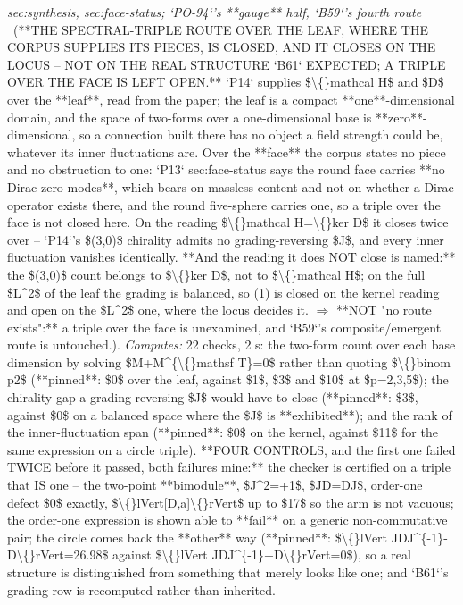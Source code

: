 \begin{description}
\textit{sec:synthesis, sec:face-status; `PO-94`'s **gauge** half, `B59`'s fourth route} \ (**THE SPECTRAL-TRIPLE ROUTE OVER THE LEAF, WHERE THE CORPUS SUPPLIES ITS PIECES, IS CLOSED, AND IT CLOSES ON THE LOCUS -- NOT ON THE REAL STRUCTURE `B61` EXPECTED; A TRIPLE OVER THE FACE IS LEFT OPEN.** `P14` supplies \$\textbackslash\{\}mathcal H\$ and \$D\$ over the **leaf**, read from the paper; the leaf is a compact **one**-dimensional domain, and the space of two-forms over a one-dimensional base is **zero**-dimensional, so a connection built there has no object a field strength could be, whatever its inner fluctuations are. Over the **face** the corpus states no piece and no obstruction to one: `P13` sec:face-status says the round face carries **no Dirac zero modes**, which bears on massless content and not on whether a Dirac operator exists there, and the round five-sphere carries one, so a triple over the face is not closed here. On the reading \$\textbackslash\{\}mathcal H=\textbackslash\{\}ker D\$ it closes twice over -- `P14`'s \$(3,0)\$ chirality admits no grading-reversing \$J\$, and every inner fluctuation vanishes identically.  **And the reading it does NOT close is named:** the \$(3,0)\$ count belongs to \$\textbackslash\{\}ker D\$, not to \$\textbackslash\{\}mathcal H\$; on the full \$L\textasciicircum{}2\$ of the leaf the grading is balanced, so (1) is closed on the kernel reading and open on the \$L\textasciicircum{}2\$ one, where the locus decides it. \ensuremath{\Rightarrow} **NOT "no route exists":** a triple over the face is unexamined, and `B59`'s composite/emergent route is untouched.). 
\emph{Computes:} 22 checks, 2 s: the two-form count over each base dimension by solving \$M+M\textasciicircum{}\{\textbackslash\{\}mathsf T\}=0\$ rather than quoting \$\textbackslash\{\}binom p2\$ (**pinned**: \$0\$ over the leaf, against \$1\$, \$3\$ and \$10\$ at \$p=2,3,5\$); the chirality gap a grading-reversing \$J\$ would have to close (**pinned**: \$3\$, against \$0\$ on a balanced space where the \$J\$ is **exhibited**); and the rank of the inner-fluctuation span (**pinned**: \$0\$ on the kernel, against \$11\$ for the same expression on a circle triple). **FOUR CONTROLS, and the first one failed TWICE before it passed, both failures mine:** the checker is certified on a triple that IS one -- the two-point **bimodule**, \$J\textasciicircum{}2=+1\$, \$JD=DJ\$, order-one defect \$0\$ exactly, \$\textbackslash\{\}lVert[D,a]\textbackslash\{\}rVert\$ up to \$17\$ so the arm is not vacuous; the order-one expression is shown able to **fail** on a generic non-commutative pair; the circle comes back the **other** way (**pinned**: \$\textbackslash\{\}lVert JDJ\textasciicircum{}\{-1\}-D\textbackslash\{\}rVert=26.98\$ against \$\textbackslash\{\}lVert JDJ\textasciicircum{}\{-1\}+D\textbackslash\{\}rVert=0\$), so a real structure is distinguished from something that merely looks like one; and `B61`'s grading row is recomputed rather than inherited.

\end{description}
